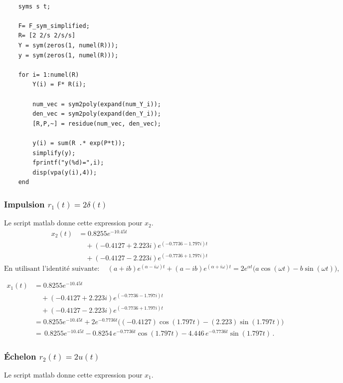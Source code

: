 \documentclass[12pt]{article}
\begin{document}
    \begin{lstlisting}[label={lst:lstlisting02}]

    syms s t;

    F= F_sym_simplified;
    R= [2 2/s 2/s/s]
    Y = sym(zeros(1, numel(R)));
    y = sym(zeros(1, numel(R)));

    for i= 1:numel(R)
        Y(i) = F* R(i);

        num_vec = sym2poly(expand(num_Y_i));
        den_vec = sym2poly(expand(den_Y_i));
        [R,P,~] = residue(num_vec, den_vec);

        y(i) = sum(R .* exp(P*t));
        simplify(y);
        fprintf("y(%d)=",i);
        disp(vpa(y(i),4));
    end
    \end{lstlisting}
    \subsubsection*{Impulsion $r_1(t)=2\delta(t)$}
    Le script matlab donne cette expression pour $x_2$.
    \[
        \begin{aligned}
            x_2(t)
            &=0.8255e^{-10.45t}\\
            &\quad+(-0.4127+2.223i)e^{(-0.7736-1.797i)t}\\
            &\quad+(-0.4127-2.223i)e^{(-0.7736+1.797i)t}
        \end{aligned}
    \]
    \[
        \text{En utilisant l'identité suivante}:\quad
        (a+ib)e^{(\alpha-i\omega)t}+(a-ib)e^{(\alpha+i\omega)t}
        =2e^{\alpha t}\big(a\cos(\omega t)-b\sin(\omega t)\big),
    \]

    \[
        \begin{aligned}
            x_1(t)
            &=0.8255e^{-10.45t}\\
            &\quad+(-0.4127+2.223i)e^{(-0.7736-1.797i)t} \\
            &\quad+(-0.4127-2.223i)e^{(-0.7736+1.797i)t}\\
            &=0.8255e^{-10.45t}+2e^{-0.7736t}\Big((-0.4127)\cos(1.797t)-(2.223)\sin(1.797t)\Big)\\
            &=\boxed{\,0.8255e^{-10.45t}-0.8254\,e^{-0.7736t}\cos(1.797t)-4.446\,e^{-0.7736t}\sin(1.797t)\,}.
        \end{aligned}
    \]

    \subsubsection*{Échelon $r_2(t)=2u(t)$}
    Le script matlab donne cette expression pour $x_1$.
\end{document}
